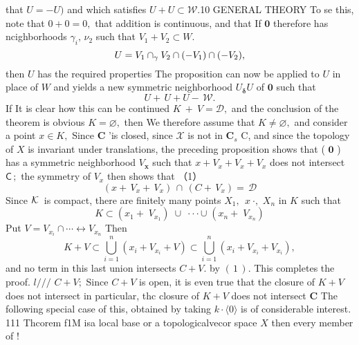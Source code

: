 that $U=-U)$ and which satisfies $U+U\subset{\mathcal W}.$10 GENERAL THEORY To se this, note that $0+0=0,$ that addition is continuous, and that If $\mathbf{0}$ therefore has ncighborhoods $\gamma_{i},\,\nu_{2}$ such that $V_{1}+V_{2}\subset W.$ $$ U=V_{1}\cap_{\bf\gamma}V_{2}\cap(-V_{1})\cap(-V_{2}), $$ then $U$ has the required properties The proposition can now be applied to $U$ in place of $W$ and yields a new symmetric neighborhood $U_{\mathbf{\delta}}U$ of $\mathbf{0}$ such that $$ U+\,U+U-\,\mathcal{W}. $$ If It is clear how this can be continued $K\ +\ V=\mathcal{D},$ and the conclusion of the theorem is obvious $K=\varnothing,$ then We therefore assume that $K\neq\varnothing,$ and consider a point $x\in K,$ Since ${\boldsymbol{C}}$ 'is closed, since $\textstyle{\mathcal{X}}$ is not in ${\boldsymbol{C}}_{s}$ C, and since the topology of $X$ is invariant under translations, the preceding proposition shows that ( ${\boldsymbol{0}}$ ) has a symmetric neighborhood $V_{\boldsymbol{x}}$ such that $x+V_{x}+V_{x}+V_{x}$ does not intersect ${\mathsf{C}}\,;$ the symmetry of $V_{x}$ then shows that （1） $$ (x+\,V_{x}+\,V_{x})\,\cap\,(C+\,V_{x})=\,\mathcal{D} $$ Since ${\cal K}\,$ is compact, there are finitely many points $X_{1},\ \ x\ \cdot,$ $X_{n}$ in $\textstyle K$ such that $$ K\subset(x_{1}+\;V_{x_{1}})\;\cup\;\cdot\cdot\cdot\cup\;(x_{n}+\;V_{x_{n}}) $$ Put $V=V_{x_{i}}\cap\cdots\longleftrightarrow V_{x_{n}}$ Then $$ K+V\subset\bigcup_{i=1}^{n}(x_{i}+V_{x_{i}}+V)\subset\bigcup_{i=1}^{n}(x_{i}+V_{x_{i}}+V_{x_{i}}), $$ and no term in this last union intersects $C+V.$ by $(\,1\,).$ This completes the proof. $l/{\big/}{\big/}$ $C+V;$ Since $C+V$ is open, it is even true that the closure of $K+V$ does not intersect in particular, thc closure of $K+V$ does not intersect ${\boldsymbol{C}}$ The following special case of this, obtained by taking $\scriptstyle k\cdot\langle0\rangle$ is of considerable interest. 111 Thcorem f1M isa local base or a topologicalvecor space $X$ then every member of !%